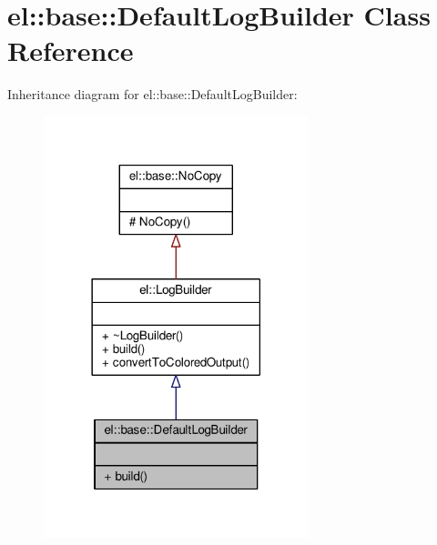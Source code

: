 \hypertarget{classel_1_1base_1_1DefaultLogBuilder}{}\section{el\+:\+:base\+:\+:Default\+Log\+Builder Class Reference}
\label{classel_1_1base_1_1DefaultLogBuilder}


Inheritance diagram for el\+:\+:base\+:\+:Default\+Log\+Builder\+:
\nopagebreak
\begin{figure}[H]
\begin{center}
\leavevmode
\includegraphics[width=218pt]{da/dd5/classel_1_1base_1_1DefaultLogBuilder__inherit__graph}
\end{center}
\end{figure}


